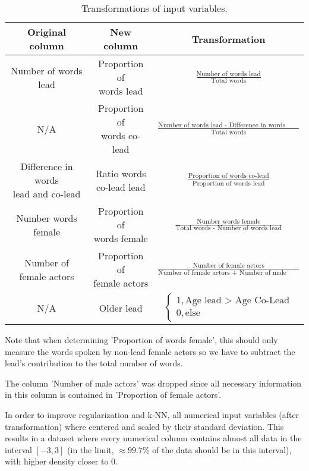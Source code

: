 \documentclass{article}
\begin{document}
\begin{table}[h]
	\centering
	\begin{tabular}{ccc}
		Original column & New column & Transformation \\
		\midrule
		Number of words lead & \makecell{Proportion of \\ words lead} & $\frac{\text{Number of words lead}}{\text{Total words}}$ \\
		N/A & \makecell{Proportion of \\ words co-lead} & $\frac{\text{Number of words lead - Difference in words lead and co-lead}}{\text{Total words}}$ \\
		\makecell{Difference in words \\ lead and co-lead} & \makecell{Ratio words \\ co-lead lead} & $\frac{\text{Proportion of words co-lead}}{\text{Proportion of words lead}}$ \\
		Number words female & \makecell{Proportion of \\ words female} & $\frac{\text{Number words female}}{\text{Total words - Number of words lead}}$ \\
		\makecell{Number of \\ female actors} & \makecell{Proportion of \\ female actors} & $\frac{\text{Number of female actors}}{\text{Number of female actors + Number of male actos}}$ \\
		N/A & Older lead & $\begin{cases} 1, \text{Age lead > Age Co-Lead} \\ 0, \text{else} \end{cases}$
	\end{tabular}
	\label{tab:transformations}
	\caption{Transformations of input variables.}
\end{table}

Note that when determining 'Proportion of words female', this should only measure the words spoken by non-lead female actors so we have to subtract the lead's contribution to the total number of words.

The column 'Number of male actors' was dropped since all necessary information in this column is contained in 'Proportion of female actors'.

In order to improve regularization and k-NN, all numerical input variables (after transformation) where centered and scaled by their standard deviation. This results in a dataset where every numerical column contains almost all data in the interval $[-3,3]$ (in the limit, $\approx 99.7\%$ of the data should be in this interval), with higher density closer to 0.
\end{document}
